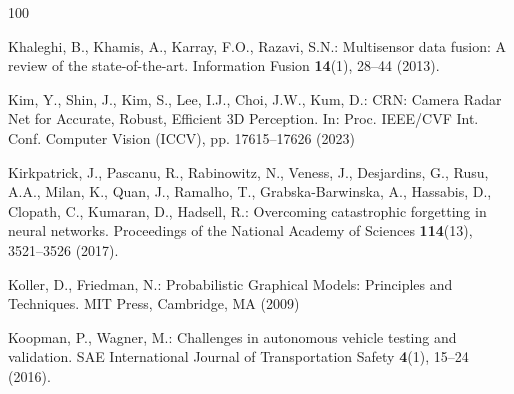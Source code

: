 \documentclass[graybox,envcountchap]{style/SNmono}
\begin{document}
\begin{thebibliography}{100}
{\par}

Khaleghi, B., Khamis, A., Karray, F.O., Razavi, S.N.: Multisensor data fusion:
  A review of the state-of-the-art.
\newblock Information Fusion \textbf{14}(1), 28--44 (2013).
\newblock {}


{\color{red} 
Kim, Y., Shin, J., Kim, S., Lee, I.J., Choi, J.W., Kum, D.: {CRN: Camera Radar
  Net for Accurate, Robust, Efficient 3D Perception}.
\newblock In: Proc. IEEE/CVF Int. Conf. Computer Vision (ICCV), pp.
  17615--17626 (2023)

\par}

Kirkpatrick, J., Pascanu, R., Rabinowitz, N., Veness, J., Desjardins, G., Rusu,
  A.A., Milan, K., Quan, J., Ramalho, T., Grabska-Barwinska, A., Hassabis, D.,
  Clopath, C., Kumaran, D., Hadsell, R.: Overcoming catastrophic forgetting in
  neural networks.
\newblock Proceedings of the National Academy of Sciences \textbf{114}(13),
  3521--3526 (2017).
\newblock {}


{\color{red} 
Koller, D., Friedman, N.: Probabilistic Graphical Models: Principles and
  Techniques.
\newblock MIT Press, Cambridge, MA (2009)

\par}

Koopman, P., Wagner, M.: Challenges in autonomous vehicle testing and
  validation.
\newblock SAE International Journal of Transportation Safety \textbf{4}(1),
  15--24 (2016).
\newblock {}




\end{thebibliography}
\end{document}

